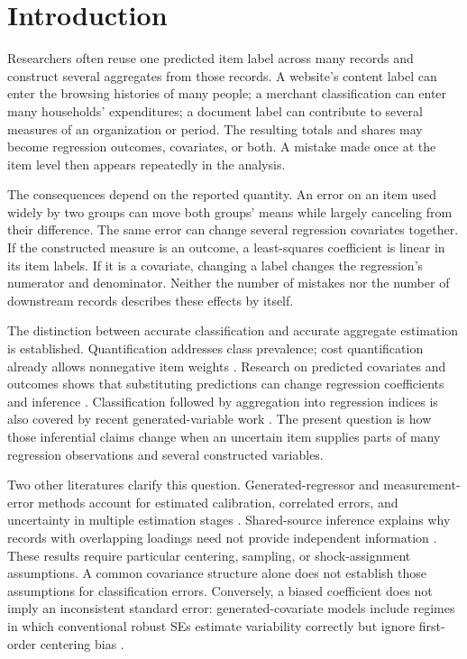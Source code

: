 \section{Introduction}
Researchers often reuse one predicted item label across many records and
construct several aggregates from those records. A website's content label
can enter the browsing histories of many people; a merchant classification
can enter many households' expenditures; a document label can contribute to
several measures of an organization or period. The resulting totals and
shares may become regression outcomes, covariates, or both. A mistake made
once at the item level then appears repeatedly in the analysis.

The consequences depend on the reported quantity. An error on an item used
widely by two groups can move both groups' means while largely canceling from
their difference. The same error can change several regression covariates
together. If the constructed measure is an outcome, a least-squares
coefficient is linear in its item labels. If it is a covariate, changing a
label changes the regression's numerator and denominator. Neither the number
of mistakes nor the number of downstream records describes these effects by
itself.

The distinction between accurate classification and accurate aggregate
estimation is established. Quantification addresses class prevalence;
cost quantification already allows nonnegative item weights
\citep{forman2008,hopkins2010,vaz2019quantification}. Research on predicted
covariates and outcomes shows that substituting predictions can change
regression coefficients and inference
\citep{fong2021predictions,wang2020postprediction}.
Classification followed by aggregation into regression indices is also
covered by recent generated-variable work
\citep{battaglia2025generated,christensen2026guide}. The present question is
how those inferential claims change when an uncertain item supplies parts of
many regression observations and several constructed variables.

Two other literatures clarify this question. Generated-regressor and
measurement-error methods account for estimated calibration, correlated
errors, and uncertainty in multiple estimation stages
\citep{pagan1984,murphy1985twostep,shaw2021correlated,boe2024sandwich}.
Shared-source inference explains why records with overlapping loadings need
not provide independent information
\citep{adao2019,borusyak2022shiftshare,owen2012arrays}. These results require
particular centering, sampling, or shock-assignment assumptions. A common
covariance structure alone does not establish those assumptions for
classification errors. Conversely, a biased coefficient does not imply an
inconsistent standard error: generated-covariate models include regimes in
which conventional robust SEs estimate variability correctly but ignore
first-order centering bias \citep{christensen2026guide,battaglia2025generated}.

